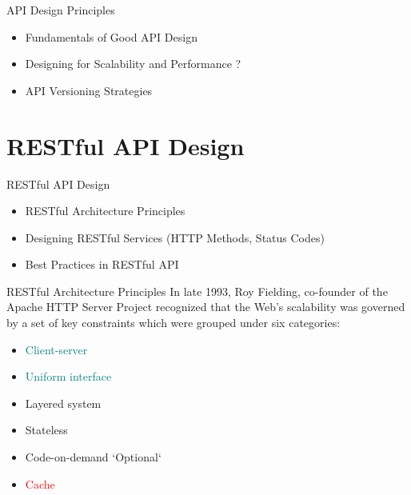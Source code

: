 \documentclass{beamer}
\begin{document}
\begin{frame}{API Design Principles}
  \begin{itemize}
    \item Fundamentals of Good API Design
    \item Designing for Scalability and Performance ?
    \item API Versioning Strategies
  \end{itemize}
\end{frame}

\section{RESTful API Design}
\begin{frame}{RESTful API Design}
  \begin{itemize}
    \item RESTful Architecture Principles
    \item Designing RESTful Services (HTTP Methods, Status Codes)
    \item Best Practices in RESTful API
  \end{itemize}
\end{frame}


\begin{frame}[t]{RESTful Architecture Principles}
	\scriptsize
	In late 1993, Roy Fielding, co-founder of the Apache HTTP Server Project recognized that the Web’s scalability was governed by a set of key constraints which were grouped under six categories:
	\begin{itemize}
    	\item \textcolor{teal}{Client-server}
    	\item \textcolor{teal}{Uniform interface}
    	\item Layered system
    	\item Stateless
    	\item Code-on-demand `Optional`
    	\item \textcolor{red} {Cache}
	\end{itemize}
\end{frame}
\end{document}
